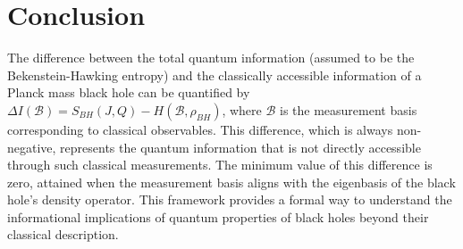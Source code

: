 \documentclass{article}
\theoremstyle{definition}
\begin{document}
	\section{Conclusion}
	
	The difference between the total quantum information (assumed to be the Bekenstein-Hawking entropy) and the classically accessible information of a Planck mass black hole can be quantified by $\Delta I(\mathcal{B}) = S_{BH}(J, Q) - H(\mathcal{B}, \rho_{BH})$, where $\mathcal{B}$ is the measurement basis corresponding to classical observables. This difference, which is always non-negative, represents the quantum information that is not directly accessible through such classical measurements. The minimum value of this difference is zero, attained when the measurement basis aligns with the eigenbasis of the black hole's density operator. This framework provides a formal way to understand the informational implications of quantum properties of black holes beyond their classical description.
	
\end{document}
